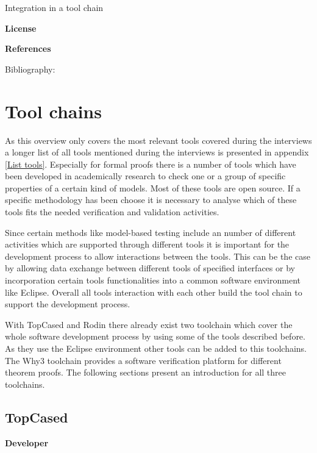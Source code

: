 \documentclass{./template/openetcs_report}
\begin{document}
	Integration in a tool chain



	\textbf{License}


	\textbf{References}

	Bibliography:


\section{Tool chains}
As this overview only covers the most relevant tools covered during the interviews a longer list of all tools mentioned during the interviews is presented in appendix \ref{List tools}. Especially for formal proofs there is a number of tools which have been developed in academically research to check one or a group of specific properties of a certain kind of models. Most of these tools are open source. If a specific methodology has been choose it is necessary to analyse which of these tools fits the needed verification and validation activities.

Since certain methods like model-based testing include an number of different activities which are supported through different tools it is important for the development process to allow interactions between the tools. This can be the case by allowing data exchange between different tools of specified interfaces or by incorporation certain tools functionalities into a common software  environment like Eclipse. Overall all tools interaction with each other build the tool chain to support the development process. 

With TopCased and Rodin there already exist two toolchain which cover the whole software development process by using some of the tools described before. As they use the Eclipse environment other tools can be added to this toolchains. The Why3 toolchain provides a software verification platform for different theorem proofs. The following sections present an introduction for all three toolchains.

\subsection{TopCased}

	\textbf{Developer}
\end{document}
